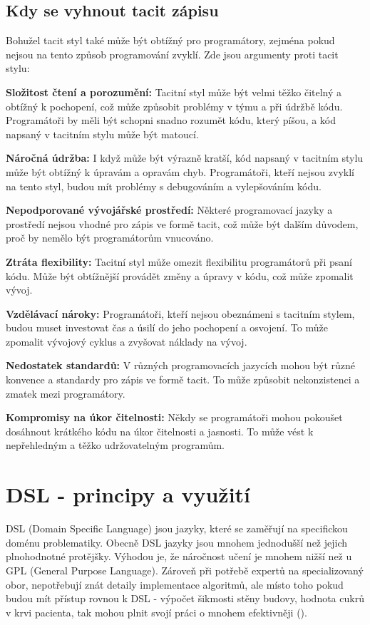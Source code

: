\documentclass[male,czech]{kithesis}
\begin{document}
\section{Kdy se vyhnout tacit zápisu}

Bohužel tacit styl také může být obtížný pro programátory, 
zejména pokud nejsou na tento způsob programování zvyklí. 
Zde jsou argumenty proti tacit stylu:

\textbf{Složitost čtení a porozumění:} 
Tacitní styl může být velmi těžko čitelný a obtížný k pochopení, 
což může způsobit problémy v týmu a při údržbě kódu. 
Programátoři by měli být schopni snadno rozumět kódu,
který píšou, a kód napsaný v tacitním stylu může být matoucí.

\textbf{Náročná údržba:}
I když může být výrazně kratší, 
kód napsaný v tacitním stylu může být obtížný k úpravám a opravám chyb. 
Programátoři, kteří nejsou zvyklí na tento styl, 
budou mít problémy s debugováním a vylepšováním kódu.

\textbf{Nepodporované vývojářské prostředí:}
Některé programovací jazyky a prostředí nejsou vhodné pro zápis ve formě tacit, 
což může být dalším důvodem, proč by nemělo být programátorům vnucováno.

\textbf{Ztráta flexibility:}
Tacitní styl může omezit flexibilitu programátorů při psaní kódu.
Může být obtížnější provádět změny a úpravy v kódu, což může zpomalit vývoj.

\textbf{Vzdělávací nároky:}
Programátoři, kteří nejsou obeznámeni s tacitním stylem, 
budou muset investovat čas a úsilí do jeho pochopení a osvojení. 
To může zpomalit vývojový cyklus a zvyšovat náklady na vývoj.

\textbf{Nedostatek standardů:}
V různých programovacích jazycích mohou být různé konvence a 
standardy pro zápis ve formě tacit. To může způsobit nekonzistenci a zmatek mezi programátory.

\textbf{Kompromisy na úkor čitelnosti:}
Někdy se programátoři mohou pokoušet dosáhnout krátkého kódu na úkor čitelnosti a jasnosti. 
To může vést k nepřehledným a těžko udržovatelným programům.

\chapter{DSL - principy a využití}
DSL (Domain Specific Language) jsou jazyky, 
které se zaměřují na specifickou doménu problematiky.
Obecně DSL jazyky jsou mnohem jednodušší než jejich plnohodnotné protějšky. 
Výhodou je, 
že náročnost učení je mnohem nižší než u GPL (General Purpose Language). 
Zároveň při potřebě expertů na specializovaný obor, 
nepotřebují znát detaily implementace algoritmů, 
ale místo toho pokud budou mít přístup rovnou k DSL - výpočet šikmosti stěny budovy,
hodnota cukrů v krvi pacienta, 
tak mohou plnit svojí práci o mnohem efektivněji (\cite{DomainSpecificLanguages}).
\end{document}
